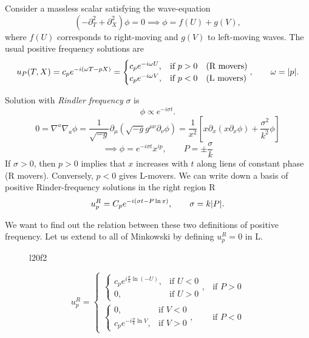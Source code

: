 Consider a massless scalar satisfying the wave-equation
\begin{equation}
  (- \partial^2_T + \partial_X^2) \phi = 0 \implies \phi = f(U) + g(V),
\end{equation}
where $f(U)$ corresponds to right-moving and $g(V)$ to left-moving waves.
The usual positive frequency solutions are 
\begin{equation}
  u_P (T, X) = c_p e^{-i (\omega T - p X)} = 
  \begin{cases}
    c_p e^{-i \omega U}, & \text{if } p > 0 \quad \text{(R movers)} \\
  c_p e^{-i \omega V}, & \text{if }  p < 0 \quad \text{(L movers)}
  \end{cases}, \qquad \omega = \abs{p}.
\end{equation}

Solution with \emph{Rindler frequency} $\sigma$ is
\begin{equation}
  \phi \propto e^{-i \sigma t}.
\end{equation}
\begin{equation}
  0 = \nabla^{a} \nabla_{a} \phi = \frac{1}{\sqrt{-g}} \partial_{\mu} (\sqrt{-g} g^{\mu\nu} \partial_{\nu} \phi) = \frac{1}{x^2} [x \partial_x (x \partial_x \phi) + \frac{\sigma^2}{k^2} \phi]
\end{equation}
\begin{equation}
  \implies \phi = e^{-i \sigma t} x^{ip}, \qquad P = \pm \frac{\sigma}{k}
\end{equation}
If $\sigma > 0$, then $p> 0$ implies that $x$ increases with $t$ along liens of constant phase (R movers).
Conversely, $p< 0$ gives L-movers.
We can write down a basis of positive Rinder-frequency solutions in the right region R
\begin{equation}
  u_p^R = C_p e^{-i (\sigma t - P \ln x)}, \qquad \sigma = k \abs{P}.
\end{equation}

We want to find out the relation between these two definitions of positive frequency.
Let us extend to all of Minkowski by defining $u_p^R = 0$ in L.
\begin{figure}[ht]
    \centering
    \caption{l20f2}
    \label{fig:l20f2}
\end{figure}
\begin{equation}
  \label{eq:21-u}
  u_p^R = 
  \begin{cases}
    \begin{cases}
      c_p e^{i \frac{\sigma}{k} \ln (-U)}, & \text{if } U < 0 \\
      0, & \text{if } U > 0 
    \end{cases}
    , & \text{if } P >0 \\
    \begin{cases}
      0, & \text{if } V < 0 \\
      c_p e^{-i \frac{\sigma}{k} \ln V}, & \text{if } V > 0 
    \end{cases}
    , & \text{if }  P < 0
  \end{cases}
\end{equation}

